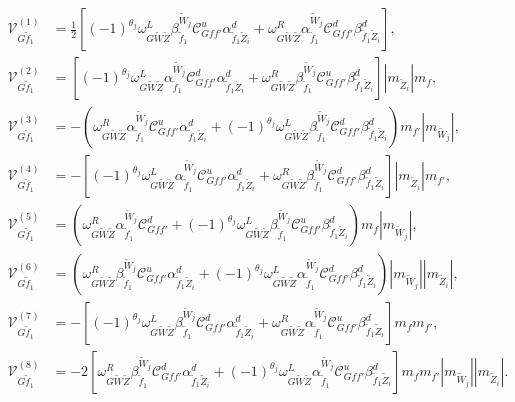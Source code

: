 \documentclass[final,3p,times]{elsarticle}
\begin{document}
\begin{align}
\mathcal{V}_{G \tilde{f}_1}^{(1)} &= \frac{1}{2}[(-1)^{\theta_j}\omega_{G \tilde{W} \tilde{Z}}^L \beta_{\tilde{f}_1}^{\tilde{W}_j} \mathcal{C}_{G f f'}^u \alpha_{\tilde{f}_1 \tilde{Z}_{i}}^{d} + \omega_{G \tilde{W} \tilde{Z}}^R \alpha_{\tilde{f}_1}^{\tilde{W}_j} \mathcal{C}_{G f f'}^d \beta_{\tilde{f}_1 \tilde{Z}_{i}}^{d}], \\
\mathcal{V}_{G \tilde{f}_1}^{(2)} &= [(-1)^{\theta_j}\omega_{G \tilde{W} \tilde{Z}}^L \alpha_{\tilde{f}_1}^{\tilde{W}_j} \mathcal{C}_{G f f'}^d \alpha_{\tilde{f}_1 \tilde{Z}_{i}}^{d} + \omega_{G \tilde{W} \tilde{Z}}^R \beta_{\tilde{f}_1}^{\tilde{W}_j} \mathcal{C}_{G f f'}^u \beta_{\tilde{f}_1 \tilde{Z}_{i}}^{d}]|m_{\tilde{Z}_i}|m_{f}, \\
\mathcal{V}_{G \tilde{f}_1}^{(3)} &= -(\omega_{G \tilde{W} \tilde{Z}}^R \alpha_{\tilde{f}_1}^{\tilde{W}_j} \mathcal{C}_{G f f'}^u \alpha_{\tilde{f}_1 \tilde{Z}_i}^{d} + (-1)^{\theta_j} \omega_{G \tilde{W} \tilde{Z}}^L \beta_{\tilde{f}_1}^{\tilde{W}_j} \mathcal{C}_{G f f'}^d \beta_{\tilde{f}_1 \tilde{Z}_{i}}^{d})m_{f'}|m_{\tilde{W}_j}|, \\
\mathcal{V}_{G \tilde{f}_1}^{(4)} &= -[(-1)^{\theta_j}\omega_{G \tilde{W} \tilde{Z}}^L \alpha_{\tilde{f}_1}^{\tilde{W}_j} \mathcal{C}_{G f f'}^u  \alpha_{\tilde{f}_1 \tilde{Z}_i}^{d} + \omega_{G \tilde{W} \tilde{Z}}^R \beta_{\tilde{f}_1}^{\tilde{W}_j} \mathcal{C}_{G f f'}^d \beta_{\tilde{f}_1 \tilde{Z}_{i}}^{d}]|m_{\tilde{Z}_i}|m_{f'}, \\
\mathcal{V}_{G \tilde{f}_1}^{(5)} &= (\omega_{G \tilde{W} \tilde{Z}}^R \alpha_{\tilde{f}_1}^{\tilde{W}_j} \mathcal{C}_{G f f'}^d + (-1)^{\theta_j}\omega_{G \tilde{W} \tilde{Z}}^L \beta_{\tilde{f}_1}^{\tilde{W}_j} \mathcal{C}_{G f f'}^u \beta_{\tilde{f}_1 \tilde{Z}_{i}}^{d})m_{f}|m_{\tilde{W}_j}| ,\\
\mathcal{V}_{G \tilde{f}_1}^{(6)} &= (\omega_{G \tilde{W} \tilde{Z}}^R \beta_{\tilde{f}_1}^{\tilde{W}_j} \mathcal{C}_{G f f'}^u \alpha_{\tilde{f}_1 \tilde{Z}_i}^{d} + (-1)^{\theta_j} \omega_{G \tilde{W} \tilde{Z}}^L \alpha_{\tilde{f}_1}^{\tilde{W}_j} \mathcal{C}_{G f f'}^d \beta_{\tilde{f}_1 \tilde{Z}_{i}}^{d})|m_{\tilde{W}_j}||m_{\tilde{Z}_i}|, \\
\mathcal{V}_{G \tilde{f}_1}^{(7)} &= -[(-1)^{\theta_j}\omega_{G \tilde{W} \tilde{Z}}^L \beta_{\tilde{f}_1}^{\tilde{W}_j} \mathcal{C}_{G f f'}^d \alpha_{\tilde{f}_1 \tilde{Z}_i}^{d} + \omega_{G \tilde{W} \tilde{Z}}^R \alpha_{\tilde{f}_1}^{\tilde{W}_j} \mathcal{C}_{G f f'}^u \beta_{\tilde{f}_1 \tilde{Z}_{i}}^{d}]m_{f}m_{f'}, \\
\mathcal{V}_{G \tilde{f}_1}^{(8)} &= -2[\omega_{G \tilde{W} \tilde{Z}}^R \beta_{\tilde{f}_1}^{\tilde{W}_j} \mathcal{C}_{G f f'}^d \alpha_{\tilde{f}_1 \tilde{Z}_i}^{d} + (-1)^{\theta_j} \omega_{G \tilde{W} \tilde{Z}}^L \alpha_{\tilde{f}_1}^{\tilde{W}_j} \mathcal{C}_{G f f'}^u \beta_{\tilde{f}_1 \tilde{Z}_{i}}^{d}]m_{f}m_{f'}|m_{\tilde{W}_j}||m_{\tilde{Z}_i}|.
\end{align}
\end{document}
